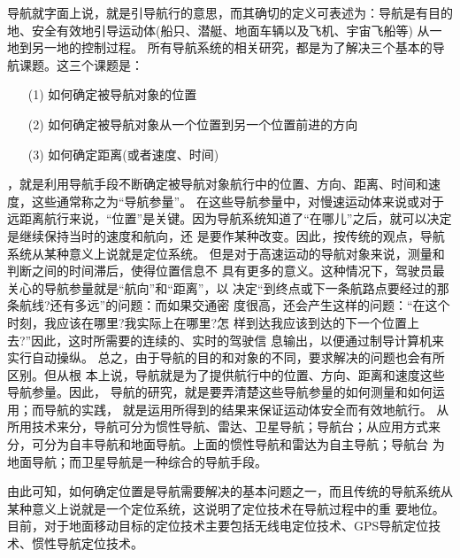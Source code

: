     导航就字面上说，就是引导航行的意思，而其确切的定义可表述为：导航是有目的地、安全有效地引导运动体(船只、潜艇、地面车辆以及飞机、宇宙飞船等)
        从一地到另一地的控制过程。
        所有导航系统的相关研究，都是为了解决三个基本的导航课题。这三个课题是：
        \begin{itemize}
            \item [(1)] 
                如何确定被导航对象的位置
            \item [(2)]
                如何确定被导航对象从一个位置到另一个位置前进的方向
            \item [(3)]
                如何确定距离(或者速度、时间)
        \end{itemize}
        ，就是利用导航手段不断确定被导航对象航行中的位置、方向、距离、时间和速度，这些通常称之为“导航参量”。
        在这些导航参量中，对慢速运动体来说或对于远距离航行来说，“位置”是关键。因为导航系统知道了“在哪儿”之后，就可以决定是继续保持当时的速度和航向，还
    是要作某种改变。因此，按传统的观点，导航系统从某种意义上说就是定位系统。
但是对于高速运动的导航对象来说，测量和判断之间的时间滞后，使得位置信息不
具有更多的意义。这种情况下，驾驶员最关心的导航参量就是“航向”和“距离”，以
决定“到终点或下一条航路点要经过的那条航线?还有多远”的问题：而如果交通密
度很高，还会产生这样的问题：“在这个时刻，我应该在哪里?我实际上在哪里?怎
样到达我应该到达的下一个位置上去?”因此，这时所需要的连续的、实时的驾驶信
息输出，以便通过制导计算机来实行自动操纵。
总之，由于导航的目的和对象的不同，要求解决的问题也会有所区别。但从根
本上说，导航就是为了提供航行中的位置、方向、距离和速度这些导航参量。因此，
导航的研究，就是要弄清楚这些导航参量的如何测量和如何运用；而导航的实践，
就是运用所得到的结果来保证运动体安全而有效地航行。
从所用技术来分，导航可分为惯性导航、雷达、卫星导航；导航台；从应用方式来分，可分为自丰导航和地面导航。上面的惯性导航和雷达为自主导航；导航台
为地面导航；而卫星导航是一种综合的导航手段。
\par
由此可知，如何确定位置是导航需要解决的基本问题之一，而且传统的导航系统从某种意义上说就是一个定位系统，这说明了定位技术在导航过程中的重
要地位。
目前，对于地面移动目标的定位技术主要包括无线电定位技术、GPS导航定位技术、惯性导航定位技术。
